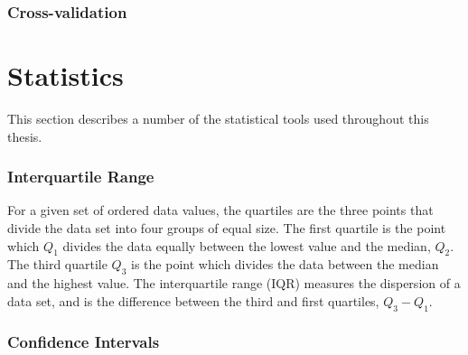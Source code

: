 \subsubsection{Cross-validation}


\section{Statistics}

This section describes a number of the statistical tools used
throughout this thesis.




\subsubsection{Interquartile Range}

For a given set of ordered data values, the quartiles are the three
points that divide the data set into four groups of equal size. The
first quartile is the point which $Q_1$ divides the data equally
between the lowest value and the median, $Q_2$. The third quartile
$Q_3$ is the point which divides the data between the median and the
highest value. The interquartile range (IQR) measures the dispersion
of a data set, and is the difference between the third and first
quartiles, $Q_3 - Q_1$.


\subsubsection{Confidence Intervals}

